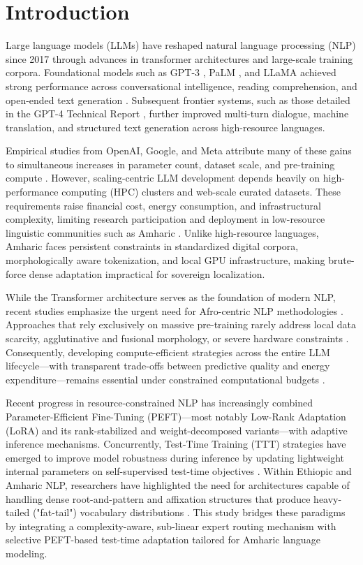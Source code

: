 \documentclass{interact}
\begin{document}
\section{Introduction}
\label{sec:introduction}

Large language models (LLMs) have reshaped natural language processing (NLP) since 2017 through advances in transformer architectures and large-scale training corpora. Foundational models such as GPT-3 \cite{ref1}, PaLM \cite{ref67}, and LLaMA \cite{ref3} achieved strong performance across conversational intelligence, reading comprehension, and open-ended text generation \cite{ref4}. Subsequent frontier systems, such as those detailed in the GPT-4 Technical Report \cite{ref66}, further improved multi-turn dialogue, machine translation, and structured text generation across high-resource languages.

Empirical studies from OpenAI, Google, and Meta attribute many of these gains to simultaneous increases in parameter count, dataset scale, and pre-training compute \cite{ref1,ref2,ref3,ref67}. However, scaling-centric LLM development depends heavily on high-performance computing (HPC) clusters and web-scale curated datasets. These requirements raise financial cost, energy consumption, and infrastructural complexity, limiting research participation and deployment in low-resource linguistic communities such as Amharic \cite{ref4,ref5,ref6}. Unlike high-resource languages, Amharic faces persistent constraints in standardized digital corpora, morphologically aware tokenization, and local GPU infrastructure, making brute-force dense adaptation impractical for sovereign localization.

While the Transformer architecture \cite{ref57} serves as the foundation of modern NLP, recent studies emphasize the urgent need for Afro-centric NLP methodologies \cite{ref58}. Approaches that rely exclusively on massive pre-training rarely address local data scarcity, agglutinative and fusional morphology, or severe hardware constraints \cite{ref7}. Consequently, developing compute-efficient strategies across the entire LLM lifecycle—with transparent trade-offs between predictive quality and energy expenditure—remains essential under constrained computational budgets \cite{ref8}.

Recent progress in resource-constrained NLP has increasingly combined Parameter-Efficient Fine-Tuning (PEFT)—most notably Low-Rank Adaptation (LoRA) \cite{ref59} and its rank-stabilized and weight-decomposed variants—with adaptive inference mechanisms. Concurrently, Test-Time Training (TTT) strategies have emerged to improve model robustness during inference by updating lightweight internal parameters on self-supervised test-time objectives \cite{ref35}. Within Ethiopic and Amharic NLP, researchers have highlighted the need for architectures capable of handling dense root-and-pattern and affixation structures that produce heavy-tailed ("fat-tail") vocabulary distributions \cite{ref58,ref60}. This study bridges these paradigms by integrating a complexity-aware, sub-linear expert routing mechanism with selective PEFT-based test-time adaptation tailored for Amharic language modeling.
\end{document}
